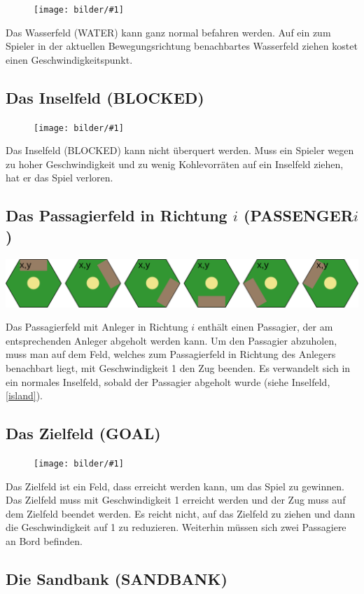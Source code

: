 \documentclass[12pt,a4paper, ngerman, oneside]{scrartcl}
\newcommand{\fieldGraphic}[1]{%
\begin{figure}%
  \texttt{[image: bilder/\#1]}%
\end{figure}%
}
\begin{document}
\fieldGraphic{wasser}

Das Wasserfeld (WATER) kann ganz normal befahren werden. Auf ein zum Spieler in
der aktuellen Bewegungsrichtung benachbartes Wasserfeld ziehen kostet einen
Geschwindigkeitspunkt.


\subsection{\label{island}Das Inselfeld (BLOCKED)}

\fieldGraphic{insel}

Das Inselfeld (BLOCKED) kann nicht überquert werden. Muss ein Spieler wegen zu
hoher Geschwindigkeit und zu wenig Kohlevorräten auf ein Inselfeld ziehen, hat
er das Spiel verloren.


\subsection{\label{passenger}Das Passagierfeld in Richtung $i$ (PASSENGER$i$)}

\includegraphics[width=\textwidth]{bilder/passagier}

Das Passagierfeld mit Anleger in Richtung $i$ enthält einen Passagier, der am
entsprechenden Anleger abgeholt werden kann. Um den Passagier abzuholen, muss
man auf dem Feld, welches zum Passagierfeld in Richtung des Anlegers benachbart
liegt, mit Geschwindigkeit 1 den Zug beenden. Es verwandelt sich in ein normales
Inselfeld, sobald der Passagier abgeholt wurde (siehe Inselfeld, \ref{island}).


\subsection{\label{goal}Das Zielfeld (GOAL)}

\fieldGraphic{ziel}

Das Zielfeld ist ein Feld, dass erreicht werden kann, um das Spiel zu gewinnen.
Das Zielfeld muss mit Geschwindigkeit 1 erreicht werden und der Zug muss auf dem
Zielfeld beendet werden. Es reicht nicht, auf das Zielfeld zu ziehen und dann
die Geschwindigkeit auf 1 zu reduzieren. Weiterhin müssen sich zwei Passagiere
an Bord befinden.


\subsection{\label{sandbank}Die Sandbank (SANDBANK)}
\end{document}
